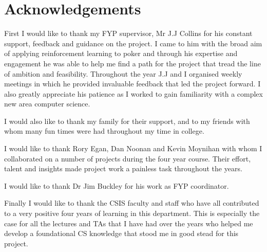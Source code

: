 
\section*{Acknowledgements}\label{sec:acknowledgements}

First I would like to thank my FYP supervisor, Mr J.J Collins for
his constant support, feedback and guidance on the project.
I came to him with the broad aim of applying reinforcement learning to poker and through
his expertise and engagement he was able to help me find a path for the project that
tread the line of ambition and feasibility.
Throughout the year J.J and I organised weekly meetings in which he provided invaluable
feedback that led the project forward.
I also greatly appreciate his patience as I worked to gain familiarity with a complex
new area computer science.

I would also like to thank my family for their support,
and to my friends with whom many fun times were had throughout my time in college.

I would like to thank Rory Egan, Dan Noonan and Kevin Moynihan with whom I collaborated on a
number of projects during the four year course.
Their effort, talent and insights made project work a painless task throughout the years.

I would like to thank Dr Jim Buckley for his work as FYP coordinator.

Finally I would like to thank the CSIS faculty and staff who have all contributed
to a very positive four years of learning in this department.
This is especially the case for all the lectures and TAs that I have had over the
years who helped me develop a foundational CS knowledge that stood me in good stead for this project.